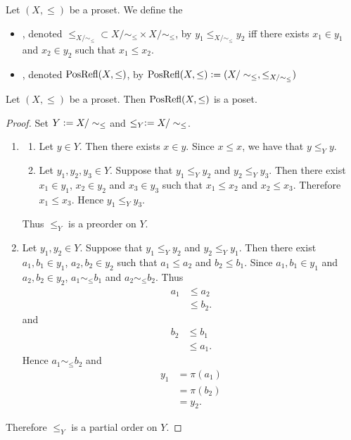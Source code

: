 \documentclass{book}
\begin{document}
	\begin{defn} 
		Let $(X, \leq)$ be a proset. We define the 
		\begin{itemize}
			\item {}, denoted $\leq_{X /\sim_{\leq}} \subset X /\sim_{\leq} \times X /\sim_{\leq}$, by $y_1 \leq_{X /\sim_{\leq}} y_2$ iff there exists $x_1 \in y_1$ and $x_2 \in y_2$ such that $x_1 \leq x_2$.
			\item {}, denoted $\operatorname{PosRefl}(X, \leq)$, by $\operatorname{PosRefl}(X, \leq) \vcentcolon= (X / \sim_{\leq}, \leq_{X/\sim_{\leq}})$
		\end{itemize}
	\end{defn}
	
	\begin{ex} 
		Let $(X, \leq)$ be a proset. Then $\operatorname{PosRefl}(X, \leq)$ is a poset. 
	\end{ex}
	
	\begin{proof}
		Set $Y \vcentcolon= X /\sim_{\leq}$ and $\leq_Y \vcentcolon= X /\sim_{\leq}$. 
		\begin{enumerate}
			\item 
			\begin{enumerate}
				\item Let $y \in Y$. Then there exists $x \in y$. Since $x \leq x$, we have that $y \leq_Y y$.
				\item Let $y_1, y_2, y_3 \in Y$. Suppose that $y_1 \leq_Y y_2$ and $y_2 \leq_Y y_3$. Then there exist $x_1 \in y_1$, $x_2 \in y_2$ and $x_3 \in y_3$ such that $x_1 \leq x_2$ and $x_2 \leq x_3$. Therefore $x_1 \leq x_3$. Hence $y_1 \leq_Y y_3$.
			\end{enumerate}
			Thus $\leq_Y$ is a preorder on $Y$.
			\item Let $y_1, y_2 \in Y$. Suppose that $y_1 \leq_Y y_2$ and $y_2 \leq_Y y_1$. Then there exist $a_1, b_1 \in y_1$, $a_2, b_2 \in y_2$ such that $a_1 \leq a_2$ and $b_2 \leq b_1$. Since $a_1, b_1 \in y_1$ and $a_2, b_2 \in y_2$, $a_1 \sim_{\leq} b_1$ and $a_2 \sim_{\leq} b_2$. Thus 
			\begin{align*}
				a_1
				& \leq a_2 \\
				& \leq b_2.
			\end{align*}
			and 
			\begin{align*}
				b_2
				& \leq b_1 \\
				& \leq a_1.
			\end{align*}
			Hence $a_1 \sim_{\leq} b_2$ and 
			\begin{align*}
				y_1
				& = \pi(a_1) \\
				& = \pi(b_2) \\
				& = y_2.
			\end{align*} 
		\end{enumerate}
		Therefore $\leq_Y$ is a partial order on $Y$. 
	\end{proof}
	
\end{document}

